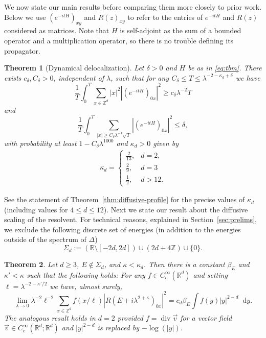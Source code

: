 \documentclass[11pt]{amsart}
\def\Real{{\mathbb R}}
\def\bbZ{{\mathbb Z}}
\DeclareMathOperator{\Div}{div}
\newcommand{\diff}{\mathop{}\!\mathrm{d}}
\numberwithin{equation}{section}
\newtheorem{theorem}{Theorem}
\numberwithin{theorem}{section}
\begin{document}
We now state our main results before comparing them more closely to prior work.  Below we use $(e^{-itH})_{xy}$ and $R(z)_{xy}$ to
refer to the entries of $e^{-itH}$ and $R(z)$ considered as matrices. Note that $H$ is self-adjoint as the sum of a bounded operator and a multiplication operator, so there is no trouble defining its propagator.
\begin{theorem}[Dynamical delocalization]
\label{thm:main-prop}
Let $\delta>0$ and $H$ be as in \eqref{eq:tbm}.
There exists $c_{\delta},C_{\delta}>0$,  independent of $\lambda$,  such that for any $C_{\delta}\leq T\leq \lambda^{-2-\kappa_d+\delta}$ we have
\begin{equation}
\label{eq:averaged-prop-in-ball}
\frac{1}{T}\int_0^{T} \sum_{x\in \mathbb{Z}^d} |x|^2|(e^{-itH})_{0x}|^2
\geq c_{\delta}\lambda^{-2}T
\end{equation}
and
\begin{equation}
\label{eq:lower-bound-prop}
\frac{1}{T}\int_0^{T} \sum_{|x|\geq C_{\delta}\lambda^{-1}\sqrt{T}} |(e^{-itH})_{0x}|^2\leq \delta,
\end{equation}
with probability at least $1-C_{\delta}\lambda^{1000}$ and $\kappa_d>0$ given by
\begin{align*}
\kappa_d =
\begin{cases}
\frac{2}{13}, &d=2, \\
\frac{2}{9}, &d=3 \\
\frac12, &d >12.
\end{cases}
\end{align*}
\end{theorem}
See the statement of Theorem~\ref{thm:diffusive-profile} for the precise values of $\kappa_d$ (including values for $4\leq d\leq 12$).
Next we state our result about the diffusive scaling of the resolvent. For technical reasons, explained in Section~\ref{sec:prelims}, we exclude the following discrete set of energies (in addition to the energies outside of the spectrum of $\Delta$)
\[
\Sigma_d := (\Real \setminus [-2d,2d]) \cup (2d+4\bbZ)  \cup \{0\}.
\]
\begin{theorem}\label{thm:scaling}
Let $d\geq 3$, $E\not\in\Sigma_d$, and $\kappa < \kappa_d$.
Then there is a constant $\beta_E$ and $\kappa'<\kappa$ such that the following holds:
For any $f\in C_c^\infty(\Real^d)$ and setting $\ell = \lambda^{-2-\kappa'/2}$ we have, almost surely,
\begin{equation}
\label{eq:resolvent-limit}
\lim_{\lambda\to 0}
\lambda^{-2} \ell^{-2}
\sum_{x\in\bbZ^d} f(x/\ell) |R(E+i\lambda^{2+\kappa})_{0x}|^2
=  c_d \beta_E \int f(y) |y|^{2-d} \diff y.
\end{equation}
The analogous result holds in $d=2$ provided $f=\Div \vec{v}$ for a vector field
$\vec{v}\in C_c^\infty(\Real^d;\Real^d)$ and $|y|^{2-d}$ is replaced by $-\log(|y|)$.
\end{theorem}
\end{document}
